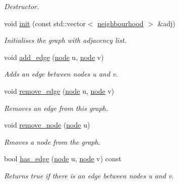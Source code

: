 \begin{DoxyCompactItemize}
\begin{DoxyCompactList}\small\item\em Destructor. \end{DoxyCompactList}\item 
void \hyperlink{classlgraph_1_1udgraph_a7f3cb28fb43c4002b41188ac8fd81d52}{init} (const std\-::vector$<$ \hyperlink{namespacelgraph_a052e7766c13f3a43cec0aec8173fdede}{neighbourhood} $>$ \&adj)
\begin{DoxyCompactList}\small\item\em Initialises the graph with adjacency list. \end{DoxyCompactList}\item 
void \hyperlink{classlgraph_1_1udgraph_a4b847dd4d6d2e814f30bcddccc16cfc6}{add\-\_\-edge} (\hyperlink{namespacelgraph_a397169dd66adf725210a30fb7251773e}{node} u, \hyperlink{namespacelgraph_a397169dd66adf725210a30fb7251773e}{node} v)
\begin{DoxyCompactList}\small\item\em Adds an edge between nodes {\itshape u} and {\itshape v}. \end{DoxyCompactList}\item 
void \hyperlink{classlgraph_1_1udgraph_af1225a134bea314254c03e18a18a41d2}{remove\-\_\-edge} (\hyperlink{namespacelgraph_a397169dd66adf725210a30fb7251773e}{node} u, \hyperlink{namespacelgraph_a397169dd66adf725210a30fb7251773e}{node} v)
\begin{DoxyCompactList}\small\item\em Removes an edge from this graph. \end{DoxyCompactList}\item 
void \hyperlink{classlgraph_1_1udgraph_a043aab345008c5eedb4cf429f85e99df}{remove\-\_\-node} (\hyperlink{namespacelgraph_a397169dd66adf725210a30fb7251773e}{node} u)
\begin{DoxyCompactList}\small\item\em Rmoves a node from the graph. \end{DoxyCompactList}\item 
bool \hyperlink{classlgraph_1_1udgraph_adbf171cd8f7a1dee31871bc4b137b543}{has\-\_\-edge} (\hyperlink{namespacelgraph_a397169dd66adf725210a30fb7251773e}{node} u, \hyperlink{namespacelgraph_a397169dd66adf725210a30fb7251773e}{node} v) const 
\begin{DoxyCompactList}\small\item\em Returns true if there is an edge between nodes {\itshape u} and {\itshape v}. \end{DoxyCompactList}\item 

\end{DoxyCompactItemize}
